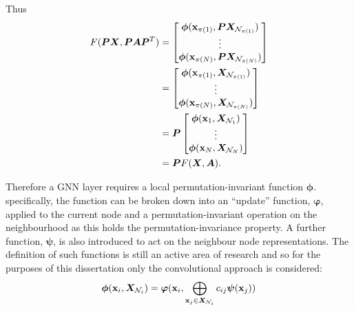Thus 
\begin{align*}
    F({\bm{P}}{\bm{X}}, {\bm{P}}{\bm{A}}{\bm{P}}^T) &= \begin{bmatrix}\bm{\phi}({\textbf{x}}_{\pi(1)}, {\bm{P}}{\bm{X}}_{{\mathcal{N}}_{\pi(1)}}) \\ \vdots \\ \bm{\phi}({\textbf{x}}_{\pi(N)}, {\bm{P}}{\bm{X}}_{{\mathcal{N}}_{\pi(N)}})\end{bmatrix} \\ 
        &= \begin{bmatrix}\bm{\phi}({\textbf{x}}_{\pi(1)}, {\bm{X}}_{{\mathcal{N}}_{\pi(1)}}) \\ \vdots \\ \bm{\phi}({\textbf{x}}_{\pi(N)}, {\bm{X}}_{{\mathcal{N}}_{\pi(N)}})\end{bmatrix} \\
        &= {\bm{P}}\begin{bmatrix}\bm{\phi}({\textbf{x}}_1, {\bm{X}}_{{\mathcal{N}}_1}) \\ \vdots \\ \bm{\phi}({\textbf{x}}_N, {\bm{X}}_{{\mathcal{N}}_N})\end{bmatrix} \\
        &= {\bm{P}} F({\bm{X}}, {\bm{A}}).
\end{align*}

Therefore a GNN layer requires a local permutation-invariant function $\bm{\phi}$.
specifically, the function can be broken down into an ``update'' function, $\bm{\varphi}$, applied to the current node and a permutation-invariant operation on the neighbourhood as this holds the permutation-invariance property.
A further function, $\bm{\psi}$, is also introduced to act on the neighbour node representations.
The definition of such functions is still an active area of research and so for the purposes of this dissertation only the convolutional approach is considered:
\begin{equation}
    \label{eq:conv-def}
    \bm{\phi}({\textbf{x}}_i, {\bm{X}}_{{\mathcal{N}}_i}) = \bm{\varphi}({\textbf{x}}_i, \bigoplus_{{\textbf{x}}_j \in {\bm{X}}_{{\mathcal{N}}_i}}c_{ij}\bm{\psi}({\textbf{x}}_j))
\end{equation}



